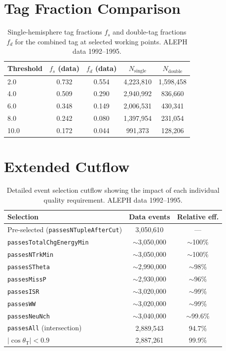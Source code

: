 \documentclass[11pt,a4paper]{article}
\begin{document}
\section{Tag Fraction Comparison}
\label{app:tag-fractions}

\begin{table}[htbp]
\centering
\caption{Single-hemisphere tag fractions $f_s$ and double-tag fractions
  $f_d$ for the combined tag at selected working points.
  ALEPH data 1992--1995.}
\label{tbl:tag-fractions}
\begin{tabular}{lcccc}
\toprule
Threshold & $f_s$ (data) & $f_d$ (data) & $N_\mathrm{single}$ & $N_\mathrm{double}$ \\
\midrule
2.0  & 0.732 & 0.554 & 4,223,810 & 1,598,458 \\
4.0  & 0.509 & 0.290 & 2,940,992 & 836,660 \\
6.0  & 0.348 & 0.149 & 2,006,531 & 430,341 \\
8.0  & 0.242 & 0.080 & 1,397,954 & 231,054 \\
10.0 & 0.172 & 0.044 & 991,373   & 128,206 \\
\bottomrule
\end{tabular}
\end{table}

\section{Extended Cutflow}
\label{app:cutflow}

\begin{table}[htbp]
\centering
\caption{Detailed event selection cutflow showing the impact of each
  individual quality requirement.  ALEPH data 1992--1995.}
\label{tbl:cutflow-extended}
\begin{tabular}{lcc}
\toprule
Selection & Data events & Relative eff. \\
\midrule
Pre-selected (\texttt{passesNTupleAfterCut}) & 3,050,610 & --- \\
\texttt{passesTotalChgEnergyMin} & $\sim$3,050,000 & $\sim$100\% \\
\texttt{passesNTrkMin} & $\sim$3,050,000 & $\sim$100\% \\
\texttt{passesSTheta} & $\sim$2,990,000 & $\sim$98\% \\
\texttt{passesMissP} & $\sim$2,930,000 & $\sim$96\% \\
\texttt{passesISR} & $\sim$3,020,000 & $\sim$99\% \\
\texttt{passesWW} & $\sim$3,020,000 & $\sim$99\% \\
\texttt{passesNeuNch} & $\sim$3,040,000 & $\sim$99.6\% \\
\texttt{passesAll} (intersection) & 2,889,543 & 94.7\% \\
$|\cos\theta_\mathrm{T}| < 0.9$ & 2,887,261 & 99.9\% \\
\bottomrule
\end{tabular}
\end{table}
\end{document}
